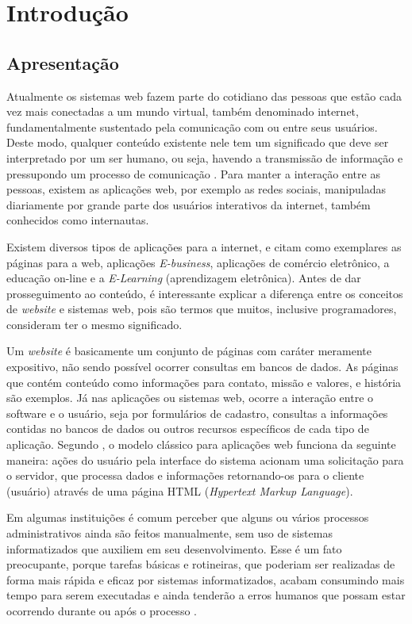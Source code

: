 \newpage
\chapter{Introdução}
\hspace{2.5cm}

\section{Apresentação}
Atualmente os sistemas web fazem parte do cotidiano das pessoas que estão cada vez mais conectadas a um mundo virtual, também denominado internet, fundamentalmente sustentado pela comunicação com ou entre seus usuários.
Deste modo, qualquer conteúdo existente nele tem um significado que deve ser interpretado por um ser humano, ou seja, havendo a transmissão de informação e pressupondo um processo de comunicação \cite{de2012rede}. Para manter a interação entre as pessoas, existem as aplicações web, por exemplo as redes sociais, manipuladas diariamente por grande parte dos usuários interativos da internet, também conhecidos como internautas. 

Existem diversos tipos de aplicações para a internet,  e  citam como exemplares as páginas para a web, aplicações \textit{E-business}, aplicações de comércio eletrônico, a educação on-line e a \textit{E-Learning} (aprendizagem eletrônica). Antes de dar prosseguimento ao conteúdo, é interessante explicar a diferença entre os conceitos de \textit{website} e sistemas web, pois são termos que muitos, inclusive programadores, consideram ter o mesmo significado. 

Um \textit{website} é basicamente um conjunto de páginas com caráter meramente expositivo, não sendo possível ocorrer consultas em bancos de dados. As páginas que contém conteúdo como informações para contato, missão e valores, e história são exemplos. Já nas aplicações ou sistemas web, ocorre a interação entre o software e o usuário, seja por formulários de cadastro, consultas a informações contidas no bancos de dados ou outros recursos específicos de cada tipo de aplicação. Segundo , o modelo clássico para aplicações web funciona da seguinte maneira: ações do usuário pela interface do sistema acionam uma solicitação para o servidor, que processa dados e informações retornando-os para o cliente (usuário) através de uma página HTML
(\textit{Hypertext Markup Language}).

Em algumas instituições é comum perceber que alguns ou vários processos administrativos ainda são feitos manualmente, sem uso de sistemas informatizados que auxiliem em seu desenvolvimento. Esse é um fato preocupante, porque tarefas básicas e rotineiras, que poderiam ser realizadas de forma mais rápida e eficaz por sistemas informatizados, acabam consumindo mais tempo para serem executadas e ainda tenderão a erros humanos que possam estar ocorrendo durante ou após o processo \cite{othman2009development}. 

